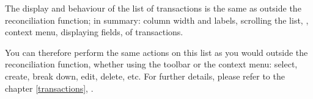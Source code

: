 The display and behaviour of the list of transactions is the same as outside the reconciliation function; in summary: column width and labels, scrolling the list, , context menu, displaying fields,  of transactions.

You can therefore perform the same actions on this list as you would outside the reconciliation function, whether using the toolbar or the context menu: select, create, break down, edit, delete, etc. For further details, please refer to the chapter \vref{transactions}, .

